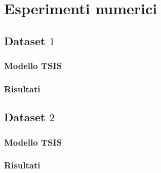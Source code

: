 
\chapter{Esperimenti numerici}
\label{cap:esperimenti}

\lipsum[1]

\section{Dataset \texorpdfstring{$1$}{1}}
\lipsum[2]

\subsection{Modello TSIS}
\lipsum[3]

\subsection{Risultati}
\lipsum[4]

\section{Dataset \texorpdfstring{$2$}{2}}
\lipsum[5]

\subsection{Modello TSIS}
\lipsum[6]

\subsection{Risultati}
\lipsum[7]
